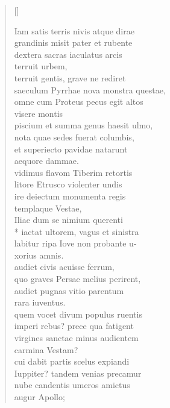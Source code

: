 \settowidth{\versewidth}{sunt quos curriculo pulverem Olympicum}
\begin{verse}[\versewidth]
\begin{patverse*}
{\large
Iam satis terris nivis atque dirae\\
grandinis misit pater et rubente 	\\
dextera sacras iaculatus arcis 	\\
  terruit urbem, 	\\
terruit gentis, grave ne rediret\\
saeculum Pyrrhae nova monstra questae, 	\\
omne cum Proteus pecus egit altos 	\\
  visere montis 	\\
piscium et summa genus haesit ulmo, 	\\
nota quae sedes fuerat columbis,\\
et superiecto pavidae natarunt 	\\
  aequore dammae. 	\\
vidimus flavom Tiberim retortis 	\\
litore Etrusco violenter undis 	\\
ire deiectum monumenta regis\\
  templaque Vestae, 	\\
Iliae dum se nimium querenti 	\\*
iactat ultorem, vagus et sinistra 	\\
labitur ripa Iove non probante u- 	\\
  xorius amnis. 	\\
audiet civis acuisse ferrum, 	\\
quo graves Persae melius perirent, 	\\
audiet pugnas vitio parentum 	\\
  rara iuventus. 	\\
quem vocet divum populus ruentis 	\\
imperi rebus? prece qua fatigent 	\\
virgines sanctae minus audientem 	\\
  carmina Vestam? 	\\
cui dabit partis scelus expiandi 	\\
Iuppiter? tandem venias precamur 	\\
nube candentis umeros amictus 	\\
  augur Apollo; 	\\
}
\end{patverse*}
\end{verse}

